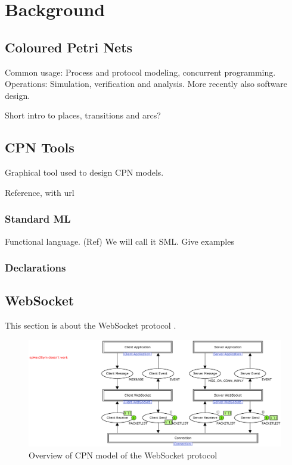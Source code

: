 \chapter{Background}
\label{chap:background}



\section{Coloured Petri Nets}
Common usage: Process and protocol modeling, concurrent programming. Operations:
Simulation, verification and analysis. More recently also software design.

Short intro to places, transitions and arcs?

\section{CPN Tools}

Graphical tool used to design CPN models. 

Reference, with url

\subsection{Standard ML}

Functional language. (Ref) We will call it SML.
Give examples

\subsection{Declarations}

\section{WebSocket}

This section is about the WebSocket
protocol \cite{draft-ietf-hybi-thewebsocketprotocol}.

\begin{figure}
\centering
\includegraphics[scale=0.4]{figures/Overview.eps}
\caption{Overview of CPN model of the WebSocket protocol}
\label{fig:overview}
\end{figure}


